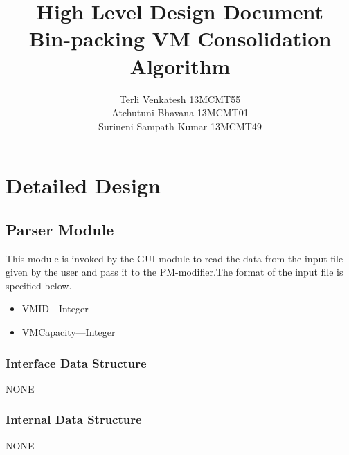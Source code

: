 \documentclass[a4paper,11pt]{article}
\title{High Level Design Document \\ Bin-packing VM Consolidation Algorithm}
\author{Terli Venkatesh 13MCMT55 \\ Atchutuni Bhavana 13MCMT01 \\ Surineni Sampath Kumar 13MCMT49}
\date{}
\begin{document}
\maketitle
\pagebreak
\tableofcontents
\pagebreak

\section{Detailed Design}

\subsection{Parser Module}
This module is invoked by the GUI module to read the data from the input file given by the user and pass it to the PM-modifier.The format of the input file is specified below.\\
\begin{itemize}
\item VM\textunderscore ID---Integer
\item VM\textunderscore Capacity---Integer
\end{itemize}
\subsubsection{Interface Data Structure}
\hspace*{1.1cm}NONE
\subsubsection{Internal Data Structure}
\hspace*{1.1cm}NONE
\end{document}
